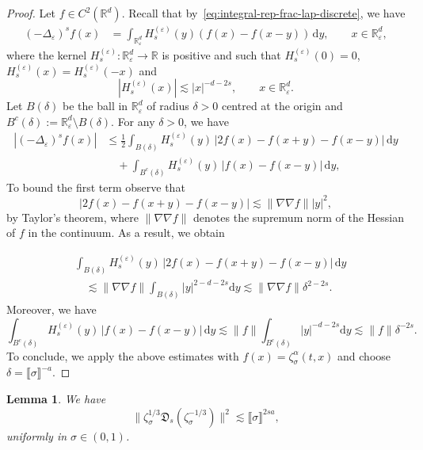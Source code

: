 \documentclass{article}
\numberwithin{equation}{section}
\newcommand{\assign}{:=}
\newcommand{\mathd}{\mathrm{d}}
\theoremstyle{plain}
\newtheorem{lemma}[theorem]{Lemma}
\theoremstyle{definition}
\begin{document}
\begin{proof}
  Let $f \in C^2 (\mathbb{R}^d)$. Recall that
  by~\eqref{eq:integral-rep-frac-lap-discrete}, we have
  \begin{align*}
    (- \Delta_{\varepsilon})^s f (x)
    &= \int_{\mathbb{R}_{\varepsilon}^d}
    H^{(\varepsilon)}_s (y) (f (x) - f (x - y))\,\mathd y,
    \qquad x \in \mathbb{R}_{\varepsilon}^d,
  \end{align*}
  where the kernel $H^{(\varepsilon)}_s : \mathbb{R}_{\varepsilon}^d
  \rightarrow \mathbb{R}$ is positive and such that $H^{(\varepsilon)}_s (0) =
  0$, $H^{(\varepsilon)}_s (x) = H^{(\varepsilon)}_s (- x)$ and
  \[ | H^{(\varepsilon)}_s (x) | \lesssim | x |^{- d - 2 s}, \qquad x \in
     \mathbb{R}_{\varepsilon}^d . \]
  Let $B (\delta)$ be the ball in $\mathbb{R}_{\varepsilon}^d$ of radius $\delta
  > 0$ centred at the origin and $B^c (\delta) \assign
  \mathbb{R}_{\varepsilon}^d \setminus B (\delta)$. For any $\delta > 0$, we
  have
\[
\begin{aligned}
	|(-\Delta_\varepsilon)^sf(x)|
	&\le \frac12\int_{B(\delta)}H_s^{(\varepsilon)}(y)\,
	|2f(x)-f(x+y)-f(x-y)|\,\mathrm dy\\
	&\quad+\int_{B^c(\delta)}H_s^{(\varepsilon)}(y)\,
	|f(x)-f(x-y)|\,\mathrm dy,
\end{aligned}
\]
  To bound the first term observe that
  \[ | 2 f (x) - f (x + y) - f (x - y) | \lesssim \| \nabla \nabla f \|  | y
     |^2, \]
  by Taylor's theorem, where $\| \nabla \nabla f \|$ denotes the supremum norm
  of the Hessian of $f$ in the continuum. As a result, we obtain
  
  
  \begin{align*}
    &\int_{B(\delta)} H^{(\varepsilon)}_s (y)
    \,|2 f (x) - f (x + y) - f (x - y)|\,\mathd y \\
    &\quad \lesssim \| \nabla \nabla f \|
    \int_{B(\delta)} | y |^{2 - d - 2 s} \mathd y
    \lesssim \| \nabla \nabla f \| \delta^{2 - 2 s} .
  \end{align*}
  Moreover, we have
  \[  \int_{B^c (\delta)} H^{(\varepsilon)}_s (y)  \,|f (x) - f (x - y)|\,
     \mathd y  \lesssim \| f \|  \int_{B^c (\delta)} | y |^{- d - 2 s}
     \mathd y \lesssim \| f \| \delta^{- 2 s} . \]
  To conclude, we apply the above estimates with $f (x) = \zeta^{\alpha}_{\sigma}
  (t, x)$ and choose $\delta = \llbracket \sigma \rrbracket^{- a}$.
\end{proof}

\begin{lemma}
  \label{lem:D-zeta}We have
  \[ \| \zeta_{\sigma}^{1 / 3} \mathfrak{D}_s
     (\zeta_{\sigma}^{- 1 / 3}) \|^2 \lesssim \llbracket \sigma \rrbracket^{2
     s a}, \]
  uniformly in $\sigma \in (0, 1)$.
\end{lemma}
\end{document}
